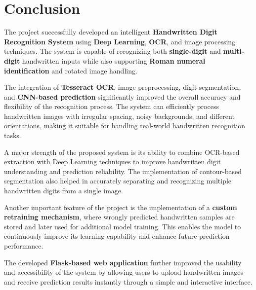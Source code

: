 \documentclass[12pt,a4paper]{article}
\begin{document}
\newpage

\section{Conclusion}

\vspace{0.3cm}

\noindent
The project successfully developed an intelligent \textbf{Handwritten Digit Recognition System} using \textbf{Deep Learning}, \textbf{OCR}, and image processing techniques. The system is capable of recognizing both \textbf{single-digit} and \textbf{multi-digit} handwritten inputs while also supporting \textbf{Roman numeral identification} and rotated image handling.

\vspace{0.3cm}

\noindent
The integration of \textbf{Tesseract OCR}, image preprocessing, digit segmentation, and \textbf{CNN-based prediction} significantly improved the overall accuracy and flexibility of the recognition process. The system can efficiently process handwritten images with irregular spacing, noisy backgrounds, and different orientations, making it suitable for handling real-world handwritten recognition tasks.

\vspace{0.3cm}

\noindent
A major strength of the proposed system is its ability to combine OCR-based extraction with Deep Learning techniques to improve handwritten digit understanding and prediction reliability. The implementation of contour-based segmentation also helped in accurately separating and recognizing multiple handwritten digits from a single image.

\vspace{0.3cm}

\noindent
Another important feature of the project is the implementation of a \textbf{custom retraining mechanism}, where wrongly predicted handwritten samples are stored and later used for additional model training. This enables the model to continuously improve its learning capability and enhance future prediction performance.

\vspace{0.3cm}

\noindent
The developed \textbf{Flask-based web application} further improved the usability and accessibility of the system by allowing users to upload handwritten images and receive prediction results instantly through a simple and interactive interface.
\end{document}
